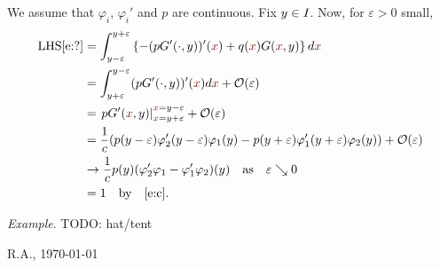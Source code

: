 \documentclass[12pt,a4paper]{article}
\begin{document}
    We assume that $\varphi_i$, $\varphi_i'$ and $p$ are continuous.
    Fix ${y} \in I$.
    Now, for $\varepsilon > 0$ small,
    \begin{align}
        \text{LHS}\eqref{e:?}
        & =
            \int_{\y - \varepsilon}^{\y + \varepsilon}
            \left\{
                -(p G'(\cdot, \y))'(\x) 
                +
                q(\x) G(\x, \y)
            \right\}
            d\x
        \\
        & =
            \int_{\y + \varepsilon}^{\y - \varepsilon}
            (p G'(\cdot, \y))'(\x) 
            d\x
            +
            \mathcal{O}(\varepsilon)
        \\
        & =
            \left.
            p G'(\x, \y)
            \right|_{\x = \y + \varepsilon}^{\x = \y - \varepsilon}
            +
            \mathcal{O}(\varepsilon)
        \\
        & =
            \frac1c
            (
                p(\y - \varepsilon) \varphi_2'(\y - \varepsilon) \varphi_1(\y)
                -
                p(\y + \varepsilon) \varphi_1'(\y + \varepsilon) \varphi_2(\y)
            )
            +
            \mathcal{O}(\varepsilon)
        \\
        & \to 
            \frac1c 
            p(\y)
            (\varphi_2' \varphi_1 - \varphi_1' \varphi_2)(\y) 
            \quad \text{as} \quad
            \varepsilon \searrow 0
        \\
        & = 
            1
            \quad \text{by} \quad \eqref{e:c}
        .
    \end{align}
  
  
     
    
    \emph{Example}. {\color{red} TODO: hat/tent} 
    
    \vfill\hfill 
    R.A., \today
\end{document}

